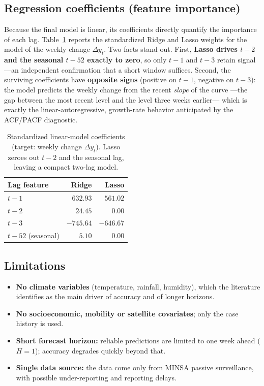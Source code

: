 \documentclass[runningheads]{llncs}
\begin{document}
\subsection{Regression coefficients (feature importance)}
Because the final model is linear, its coefficients directly quantify the importance of each
lag. Table~\ref{tab:coef} reports the standardized Ridge and Lasso weights for the model of
the weekly change $\Delta y_t$. Two facts stand out. First, \textbf{Lasso drives $t{-}2$ and
the seasonal $t{-}52$ exactly to zero}, so only $t{-}1$ and $t{-}3$ retain signal ---an
independent confirmation that a short window suffices. Second, the surviving coefficients
have \textbf{opposite signs} (positive on $t{-}1$, negative on $t{-}3$): the model predicts
the weekly change from the recent \emph{slope} of the curve ---the gap between the most recent
level and the level three weeks earlier--- which is exactly the linear-autoregressive,
growth-rate behavior anticipated by the ACF/PACF diagnostic.

\begin{table}[t]
\centering\footnotesize
\caption{Standardized linear-model coefficients (target: weekly change $\Delta y_t$). Lasso
zeroes out $t{-}2$ and the seasonal lag, leaving a compact two-lag model.}
\label{tab:coef}
\begin{tabular}{@{}lrr@{}}
\toprule
Lag feature & Ridge & Lasso \\
\midrule
$t-1$ & $632.93$ & $561.02$ \\
$t-2$ & $24.45$ & $0.00$ \\
$t-3$ & $-745.64$ & $-646.67$ \\
$t-52$ (seasonal) & $5.10$ & $0.00$ \\
\bottomrule
\end{tabular}
\end{table}

\subsection{Limitations}
\begin{itemize}\itemsep1pt
  \item \textbf{No climate variables} (temperature, rainfall, humidity), which the literature
  identifies as the main driver of accuracy and of longer horizons.
  \item \textbf{No socioeconomic, mobility or satellite covariates}; only the case history is
  used.
  \item \textbf{Short forecast horizon:} reliable predictions are limited to one week ahead
  ($H=1$); accuracy degrades quickly beyond that.
  \item \textbf{Single data source:} the data come only from MINSA passive surveillance, with
  possible under-reporting and reporting delays.
\end{itemize}
\end{document}
